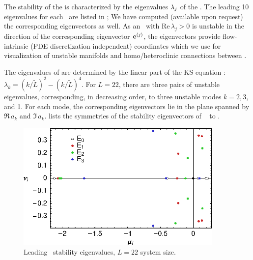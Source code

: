 The stability of the {\eqva} is characterized by the eigenvalues
$\eigExp[j]$ of the \stabmat.  The leading 10 eigenvalues for each
\eqv\ are listed in ;
We have computed (available upon request)
the corresponding eigenvectors as well. As an \eqv\ with $\mathrm{Re}\,
\lambda_j > 0$ is unstable in the direction of the corresponding
eigenvector $\jEigvec{j}$, the eigenvectors provide flow-intrinsic
(PDE discretization independent) coordinates which we use for visualization
of unstable manifolds and homo/heteroclinic connections between
\eqva.

The eigenvalues of  are determined by the linear part of the KS
equation : $\lambda_k=(k/\tilde{L})^2-(k/\tilde{L})^4$.
For $L=22$, there are three pairs of unstable eigenvalues, corresponding,
in decreasing order, to three unstable modes $k=2,3$, and 1.  For each
mode, the corresponding eigenvectors lie in the plane spanned by
$\Re \, a_k$ and $\Im \, a_k$. 
lists the symmetries of the stability eigenvectors of
\eqva\  to .

\begin{figure}[t]
\begin{center}
\includegraphics[width=4in]{figs/L22-eqvaEigenvalues.eps}
\end{center}
\caption{
Leading  \eqv\ stability eigenvalues,
$L=22$ system size.
}
\label{f:KS22EkEigs}
\end{figure}

